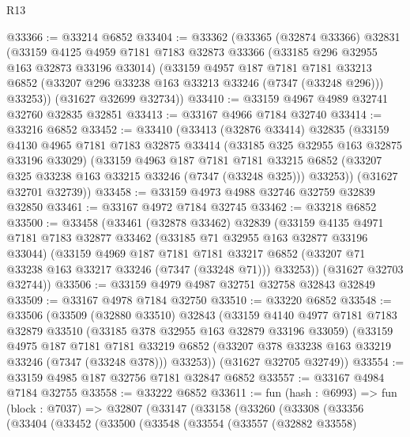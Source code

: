 \begin{lexlean}{R13}
\begin{coremodule}
@33366 := @33214 @6852
@33404 := @33362
    (@33365
      (@32874 @33366)
      @32831
      (@33159
        @4125
        @4959
        @7181
        @7183
        @32873
        @33366
        (@33185 @296 @32955 @163 @32873 @33196 @33014)
        (@33159
          @4957
          @187
          @7181
          @7181
          @33213
          @6852
          (@33207 @296 @33238 @163 @33213 @33246 (@7347 (@33248 @296)))
          @33253))
      (@31627 @32699 @32734))
@33410 := @33159 @4967 @4989 @32741 @32760 @32835 @32851
@33413 := @33167 @4966 @7184 @32740
@33414 := @33216 @6852
@33452 := @33410
    (@33413
      (@32876 @33414)
      @32835
      (@33159
        @4130
        @4965
        @7181
        @7183
        @32875
        @33414
        (@33185 @325 @32955 @163 @32875 @33196 @33029)
        (@33159
          @4963
          @187
          @7181
          @7181
          @33215
          @6852
          (@33207 @325 @33238 @163 @33215 @33246 (@7347 (@33248 @325)))
          @33253))
      (@31627 @32701 @32739))
@33458 := @33159 @4973 @4988 @32746 @32759 @32839 @32850
@33461 := @33167 @4972 @7184 @32745
@33462 := @33218 @6852
@33500 := @33458
    (@33461
      (@32878 @33462)
      @32839
      (@33159
        @4135
        @4971
        @7181
        @7183
        @32877
        @33462
        (@33185 @71 @32955 @163 @32877 @33196 @33044)
        (@33159
          @4969
          @187
          @7181
          @7181
          @33217
          @6852
          (@33207 @71 @33238 @163 @33217 @33246 (@7347 (@33248 @71)))
          @33253))
      (@31627 @32703 @32744))
@33506 := @33159 @4979 @4987 @32751 @32758 @32843 @32849
@33509 := @33167 @4978 @7184 @32750
@33510 := @33220 @6852
@33548 := @33506
    (@33509
      (@32880 @33510)
      @32843
      (@33159
        @4140
        @4977
        @7181
        @7183
        @32879
        @33510
        (@33185 @378 @32955 @163 @32879 @33196 @33059)
        (@33159
          @4975
          @187
          @7181
          @7181
          @33219
          @6852
          (@33207 @378 @33238 @163 @33219 @33246 (@7347 (@33248 @378)))
          @33253))
      (@31627 @32705 @32749))
@33554 := @33159 @4985 @187 @32756 @7181 @32847 @6852
@33557 := @33167 @4984 @7184 @32755
@33558 := @33222 @6852
@33611 := fun (hash : @6993) =>
  fun (block : @7037) =>
  @32807
    (@33147
      (@33158
        (@33260
          (@33308
            (@33356
              (@33404
                (@33452
                  (@33500
                    (@33548
                      (@33554
                        (@33557
                          (@32882 @33558)

\end{coremodule}
\end{lexlean}

